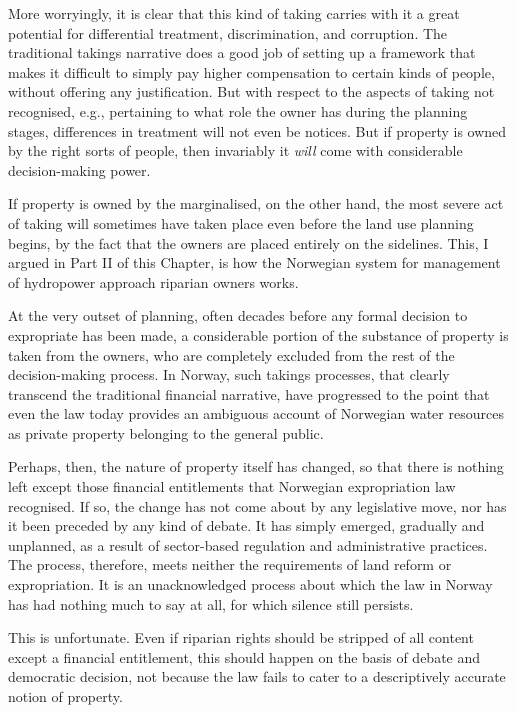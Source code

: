 More worryingly, it is clear that this kind of taking carries with it a great potential for differential treatment, discrimination, and corruption. The traditional takings narrative does a good job of setting up a framework that makes it difficult to simply pay higher compensation to certain kinds of people, without offering any justification. But with respect to the aspects of taking not recognised, e.g., pertaining to what role the owner has during the planning stages, differences in treatment will not even be notices. But if property is owned by the right sorts of people, then invariably it {\it will} come with considerable decision-making power. 

If property is owned by the marginalised, on the other hand, the most severe act of taking will sometimes have taken place even before the land use planning begins, by the fact that the owners are placed entirely on the sidelines. This, I argued in Part II of this Chapter, is how the Norwegian system for management of hydropower approach riparian owners works. 

At the very outset of planning, often decades before any formal decision to expropriate has been made, a considerable portion of the substance of property is taken from the owners, who are completely excluded from the rest of the decision-making process. In Norway, such takings processes, that clearly transcend the traditional financial narrative, have progressed to the point that even the law today provides an ambiguous account of Norwegian water resources as private property belonging to the general public.

Perhaps, then, the nature of property itself has changed, so that there is nothing left except those financial entitlements that Norwegian expropriation law recognised. If so, the change has not come about by any legislative move, nor has it been preceded by any kind of debate. It has simply emerged, gradually and unplanned, as a result of sector-based regulation and administrative practices. The process, therefore, meets neither the requirements of land reform or expropriation. It is an unacknowledged process about which the law in Norway has had nothing much to say at all, for which silence still persists. 

This is unfortunate. Even if riparian rights should be stripped of all content except a financial entitlement, this should happen on the basis of debate and democratic decision, not because the law fails to cater to a descriptively accurate notion of property.


